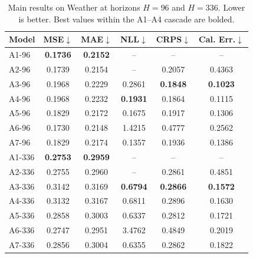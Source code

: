 \documentclass{llncs}
\begin{document}
\begin{table}[t]
\centering
\caption{Main results on Weather at horizons $H{=}96$ and $H{=}336$. Lower is better. Best values within the A1–A4 cascade are bolded.}
\label{tab:compact_results}
\scriptsize
\setlength{\tabcolsep}{4pt}
\begin{tabular}{lccccc}
\toprule
Model & MSE$\downarrow$ & MAE$\downarrow$ & NLL$\downarrow$ & CRPS$\downarrow$ & Cal. Err.$\downarrow$ \\
\midrule
A1-96  & \textbf{0.1736} & \textbf{0.2152} & --              & --              & --              \\
A2-96  & 0.1739          & 0.2154          & --              & 0.2057          & 0.4363          \\
A3-96  & 0.1968          & 0.2229          & 0.2861          & \textbf{0.1848} & \textbf{0.1023} \\
A4-96  & 0.1968          & 0.2232          & \textbf{0.1931} & 0.1864          & 0.1115          \\
A5-96  & 0.1829          & 0.2172          & 0.1675          & 0.1917          & 0.1306          \\
A6-96  & 0.1730          & 0.2148          & 1.4215          & 0.4777          & 0.2562          \\
A7-96  & 0.1829          & 0.2174          & 0.1357          & 0.1936          & 0.1386          \\
\midrule
A1-336 & \textbf{0.2753} & \textbf{0.2959} & --              & --              & --              \\
A2-336 & 0.2755          & 0.2960          & --              & 0.2861          & 0.4851          \\
A3-336 & 0.3142          & 0.3169          & \textbf{0.6794} & \textbf{0.2866} & \textbf{0.1572} \\
A4-336 & 0.3132          & 0.3167          & 0.6811          & 0.2896          & 0.1630          \\
A5-336 & 0.2858          & 0.3003          & 0.6337          & 0.2812          & 0.1721          \\
A6-336 & 0.2747          & 0.2951          & 3.4762          & 0.4849          & 0.2019          \\
A7-336 & 0.2856          & 0.3004          & 0.6355          & 0.2862          & 0.1822          \\
\bottomrule
\end{tabular}
\end{table}
\end{document}
